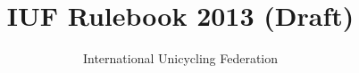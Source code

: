 \documentclass[a4paper,oneside,parskip=half]{scrbook}
\title{IUF Rulebook 2013 (Draft)}
\author{International Unicycling Federation}
\date{\gitCommitterDate \\ \gitReferences \\ \gitHash}
\begin{document}
\maketitle
\doparttoc
\tableofcontents

\mainmatter










\backmatter

\end{document}
